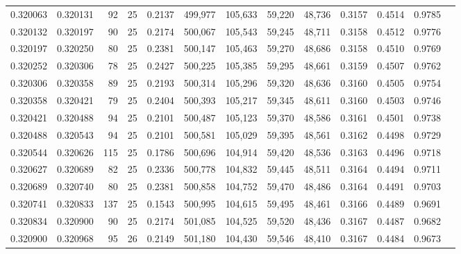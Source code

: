 \begin{tabular}{rrrrrrrrrrrrr}
0.320063 & 0.320131 &    92 &  25 &                                     0.2137 & 499,977 & 105,633 &  59,220 &  48,736 & 0.3157 & 0.4514 & 0.9785 \\
0.320132 & 0.320197 &    90 &  25 &                                     0.2174 & 500,067 & 105,543 &  59,245 &  48,711 & 0.3158 & 0.4512 & 0.9776 \\
0.320197 & 0.320250 &    80 &  25 &                                     0.2381 & 500,147 & 105,463 &  59,270 &  48,686 & 0.3158 & 0.4510 & 0.9769 \\
0.320252 & 0.320306 &    78 &  25 &                                     0.2427 & 500,225 & 105,385 &  59,295 &  48,661 & 0.3159 & 0.4507 & 0.9762 \\
0.320306 & 0.320358 &    89 &  25 &                                     0.2193 & 500,314 & 105,296 &  59,320 &  48,636 & 0.3160 & 0.4505 & 0.9754 \\
0.320358 & 0.320421 &    79 &  25 &                                     0.2404 & 500,393 & 105,217 &  59,345 &  48,611 & 0.3160 & 0.4503 & 0.9746 \\
0.320421 & 0.320488 &    94 &  25 &                                     0.2101 & 500,487 & 105,123 &  59,370 &  48,586 & 0.3161 & 0.4501 & 0.9738 \\
0.320488 & 0.320543 &    94 &  25 &                                     0.2101 & 500,581 & 105,029 &  59,395 &  48,561 & 0.3162 & 0.4498 & 0.9729 \\
0.320544 & 0.320626 &   115 &  25 &                                     0.1786 & 500,696 & 104,914 &  59,420 &  48,536 & 0.3163 & 0.4496 & 0.9718 \\
0.320627 & 0.320689 &    82 &  25 &                                     0.2336 & 500,778 & 104,832 &  59,445 &  48,511 & 0.3164 & 0.4494 & 0.9711 \\
0.320689 & 0.320740 &    80 &  25 &                                     0.2381 & 500,858 & 104,752 &  59,470 &  48,486 & 0.3164 & 0.4491 & 0.9703 \\
0.320741 & 0.320833 &   137 &  25 &                                     0.1543 & 500,995 & 104,615 &  59,495 &  48,461 & 0.3166 & 0.4489 & 0.9691 \\
0.320834 & 0.320900 &    90 &  25 &                                     0.2174 & 501,085 & 104,525 &  59,520 &  48,436 & 0.3167 & 0.4487 & 0.9682 \\
0.320900 & 0.320968 &    95 &  26 &                                     0.2149 & 501,180 & 104,430 &  59,546 &  48,410 & 0.3167 & 0.4484 & 0.9673 \\

\end{tabular}
